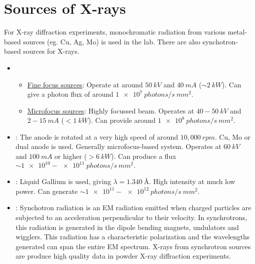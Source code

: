 \section{Sources of X-rays}

	For X-ray diffraction experiments, monochromatic radiation from various metal-based sources (eg. Cu, Ag, Mo) is used in the lab. There are also synchotron-based sources for X-rays.%
%			
	\begin{itemize}%
%			
	    \item {}%
%			    	
	    	\begin{itemize}[label={$\hookrightarrow$}]%
%			    	
	    	    \item \ul{Fine focus sources}: Operate at around $50~\si{kV}$ and $40~\si{mA}$ ($\sim \SI{2}{kW}$). Can give a photon flux of around $\SI{1e7}{photons/s~mm^2}.$
	    	    
	    	    \item \ul{Microfocus sources}: Highly focussed beam. Operates at $40-50~\si{kV}$ and $2-15~\si{mA}$  ($<\SI{1}{kW}$). Can provide around $\SI{1e8}{photons/s~mm^2}.$
	    	    
	    	\end{itemize}
	    	
	    \item {}: The anode is rotated at a very high speed of around $10,000~\si{rpm}.$ Cu, Mo or dual anode is used. Generally microfocus-based system. Operates at $\SI{60}{kV}$ and $\SI{100}{mA}$ or higher ($> \SI{6}{kW}$). Can produce a flux $\sim \num{1e10}-\num{e11}~\si{photons/s~mm^2}.$
	    
	    \item {}: Liquid Gallium is used, giving $\lambda = \SI{1.340}{\angstrom}.$ High intensity at much low power. Can generate $\sim \num{1e11}-\num{e12}~\si{photons/s~mm^2}.$
	    
	    \item {}: Synchotron radiation is an EM radiation emitted when charged particles are subjected to an acceleration perpendicular to their velocity. In synchrotrons, this radiation is generated in the dipole bending magnets, undulators and wigglers. This radiation has a characteristic polarization and the wavelengths generated can span the entire EM spectrum. X-rays from synchrotron sources are produce high quality data in powder X-ray diffraction experiments.
	    
	\end{itemize}